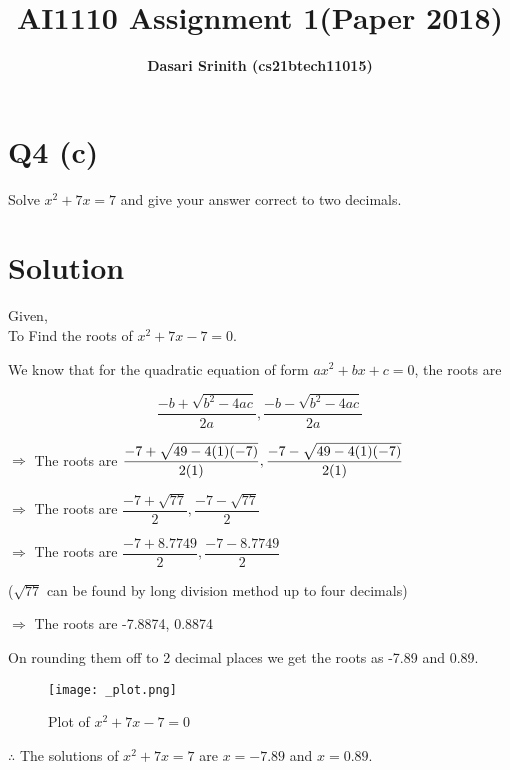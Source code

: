 \documentclass[12pt,letterpaper,twocolumn]{article}
\title{\textbf{AI1110 Assignment 1(Paper 2018)}}
\author{\textbf{Dasari Srinith (cs21btech11015)}}
\date{}
\begin{document}
\maketitle

\section*{Q4 (c)}
    Solve $x^2 + 7x = 7$ and give your answer correct to two decimals.
\vspace{-0.5cm}
\section*{Solution}

    Given,\\
    To Find the roots of $x^2 +7x -7 = 0$.
    
    We know that for the quadratic equation of form $ax^2 + bx +c = 0$,
    the roots are
    
    $$\dfrac{-b+\sqrt{b^2 -4ac}}{2a},\dfrac{-b-\sqrt{b^2 -4ac}}{2a}$$
    
    $\Rightarrow$ The roots are $\dfrac{-7+\sqrt{49 -4(1)(-7)}}{2(1)}
                       ,\\\dfrac{-7-\sqrt{49 -4(1)(-7)}}{2(1)}$
                       
    $\Rightarrow$ The roots are $\dfrac{-7+\sqrt{77}}{2}
                       ,\dfrac{-7-\sqrt{77}}{2}$
                       
    $\Rightarrow$ The roots are $\dfrac{-7+8.7749}{2}
                       ,\dfrac{-7-8.7749}{2}$
                       
    ($\sqrt{77}$ can be found by long division method up to four decimals)
    
    $\Rightarrow$ The roots are -7.8874, 0.8874
    
    On rounding them off to 2 decimal places we get the roots as -7.89 and 0.89.
    
    \begin{figure}[H]
        \centering
        \texttt{[image: \_plot.png]}
        \caption{Plot of $x^2 + 7x - 7 =0 $}
    \end{figure}
 
    $\therefore$ The solutions of $x^2 + 7x = 7$ are  $x = -7.89$ and $x = 0.89$.
    
\end{document}
